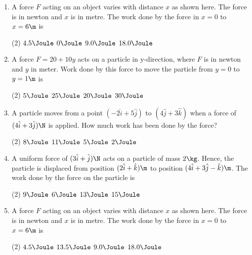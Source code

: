\documentclass{article}
\begin{document}
\begin{enumerate}
\item A force $F$ acting on an object varies with distance $x$ as shown here. The force is in newton and $x$ is in metre. The work done by the force in $x=0$ to $x=6\m$ is
\begin{center}
\end{center}
\begin{tasks}(2)
	\task $4.5\Joule$
	\task $0\Joule$\ans
	\task $9.0\Joule$\ans
	\task $18.0\Joule$
\end{tasks}

\item A force $F=20+10y$ acts on a particle in y-direction, where $F$ is in newton and $y$ in meter. Work done by this force to move the particle from $y=0$ to $y=1\m$ is
\begin{tasks}(2)
	\task $5\Joule$
	\task $25\Joule$\ans
	\task $20\Joule$
	\task $30\Joule$
\end{tasks}

\item A particle moves from a point $(-2\hat{i} + 5\hat{j})$ to $(4\hat{j} + 3\hat{k})$ when a force of $(4\hat{i} + 3\hat{j})\N$ is applied. How much work has been done by the force?
\begin{tasks}(2)
	\task $8\Joule$
	\task $11\Joule$
	\task $5\Joule$\ans
	\task $2\Joule$
\end{tasks}

\item A uniform force of $(3\hat{i} + \hat{j})\N$ acts on a particle of mass $2\kg$. Hence, the particle is displaced from position $(2\hat{i}+\hat{k})\m$ to position $(4\hat{i} +3\hat{j} -\hat{k})\m$. The work done by the force on the particle is
\begin{tasks}(2)
	\task $9\Joule$\ans
	\task $6\Joule$
	\task $13\Joule$
	\task $15\Joule$
\end{tasks}



\item A force $F$ acting on an object varies with distance $x$ as shown here. The force is in newton and $x$ is in metre. The work done by the force in $x=0$ to $x=6\m$ is
\begin{center}
\end{center}
\begin{tasks}(2)
	\task $4.5\Joule$
	\task $13.5\Joule$\ans
	\task $9.0\Joule$
	\task $18.0\Joule$
\end{tasks}


\end{enumerate}
\end{document}
